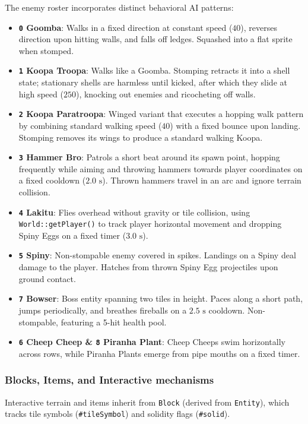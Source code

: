 \documentclass[12pt, a4paper]{article}
\begin{document}
The enemy roster incorporates distinct behavioral AI patterns:
\begin{itemize}
\item \textbf{\texttt{0} Goomba}: Walks in a fixed direction at constant speed ($40$), reverses direction upon hitting walls, and falls off ledges. Squashed into a flat sprite when stomped.
\item \textbf{\texttt{1} Koopa Troopa}: Walks like a Goomba. Stomping retracts it into a shell state; stationary shells are harmless until kicked, after which they slide at high speed ($250$), knocking out enemies and ricocheting off walls.
\item \textbf{\texttt{2} Koopa Paratroopa}: Winged variant that executes a hopping walk pattern by combining standard walking speed ($40$) with a fixed bounce upon landing. Stomping removes its wings to produce a standard walking Koopa.
\item \textbf{\texttt{3} Hammer Bro}: Patrols a short beat around its spawn point, hopping frequently while aiming and throwing hammers towards player coordinates on a fixed cooldown ($2.0\text{ s}$). Thrown hammers travel in an arc and ignore terrain collision.
\item \textbf{\texttt{4} Lakitu}: Flies overhead without gravity or tile collision, using \texttt{World::getPlayer()} to track player horizontal movement and dropping Spiny Eggs on a fixed timer ($3.0\text{ s}$).
\item \textbf{\texttt{5} Spiny}: Non-stompable enemy covered in spikes. Landings on a Spiny deal damage to the player. Hatches from thrown Spiny Egg projectiles upon ground contact.
\item \textbf{\texttt{7} Bowser}: Boss entity spanning two tiles in height. Paces along a short path, jumps periodically, and breathes fireballs on a $2.5\text{ s}$ cooldown. Non-stompable, featuring a 5-hit health pool.
\item \textbf{\texttt{6} Cheep Cheep \& \texttt{8} Piranha Plant}: Cheep Cheeps swim horizontally across rows, while Piranha Plants emerge from pipe mouths on a fixed timer.
\end{itemize}

\newpage

\subsubsection{Blocks, Items, and Interactive mechanisms}

Interactive terrain and items inherit from \texttt{Block} (derived from \texttt{Entity}), which tracks tile symbols (\texttt{\#tileSymbol}) and solidity flags (\texttt{\#solid}).
\end{document}

